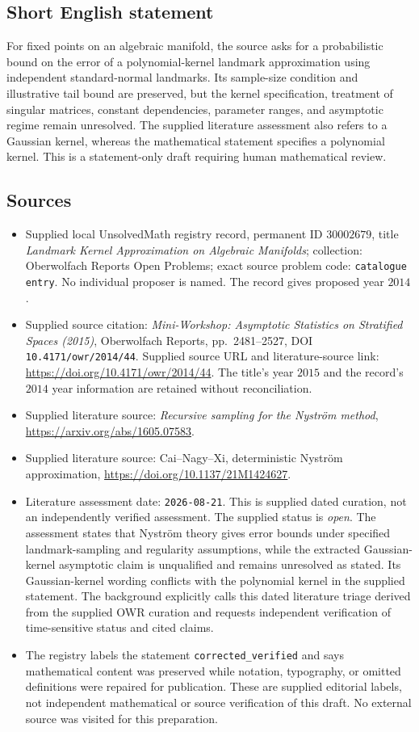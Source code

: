 \documentclass[11pt]{article}
\begin{document}
\subsection{Short English statement}
For fixed points on an algebraic manifold, the source asks for a probabilistic bound on the error of a polynomial-kernel landmark approximation using independent standard-normal landmarks. Its sample-size condition and illustrative tail bound are preserved, but the kernel specification, treatment of singular matrices, constant dependencies, parameter ranges, and asymptotic regime remain unresolved. The supplied literature assessment also refers to a Gaussian kernel, whereas the mathematical statement specifies a polynomial kernel. This is a statement-only draft requiring human mathematical review.
\subsection{Sources}
\begin{itemize}
\item Supplied local UnsolvedMath registry record, permanent ID \(30002679\), title \emph{Landmark Kernel Approximation on Algebraic Manifolds}; collection: Oberwolfach Reports Open Problems; exact source problem code: \texttt{catalogue entry}. No individual proposer is named. The record gives proposed year \(2014\).
\item Supplied source citation: \emph{Mini-Workshop: Asymptotic Statistics on Stratified Spaces (2015)}, Oberwolfach Reports, pp.\ 2481--2527, DOI \texttt{10.4171/owr/2014/44}. Supplied source URL and literature-source link: \url{https://doi.org/10.4171/owr/2014/44}. The title's year \(2015\) and the record's \(2014\) year information are retained without reconciliation.
\item Supplied literature source: \emph{Recursive sampling for the Nystr\"om method}, \url{https://arxiv.org/abs/1605.07583}.
\item Supplied literature source: Cai--Nagy--Xi, deterministic Nystr\"om approximation, \url{https://doi.org/10.1137/21M1424627}.
\item Literature assessment date: \texttt{2026-08-21}. This is supplied dated curation, not an independently verified assessment. The supplied status is \emph{open}. The assessment states that Nystr\"om theory gives error bounds under specified landmark-sampling and regularity assumptions, while the extracted Gaussian-kernel asymptotic claim is unqualified and remains unresolved as stated. Its Gaussian-kernel wording conflicts with the polynomial kernel in the supplied statement. The background explicitly calls this dated literature triage derived from the supplied OWR curation and requests independent verification of time-sensitive status and cited claims.
\item The registry labels the statement \texttt{corrected\_verified} and says mathematical content was preserved while notation, typography, or omitted definitions were repaired for publication. These are supplied editorial labels, not independent mathematical or source verification of this draft. No external source was visited for this preparation.
\end{itemize}
\end{document}
